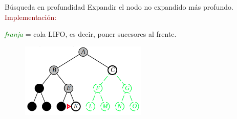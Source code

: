 \begin{frame}{Búsqueda en profundidad}
Expandir el nodo no expandido más profundo.\\
\textcolor{DarkRed}{Implementación:}
\begin{center}
    \textit{\textcolor{Green}{franja}} = cola LIFO, es decir, poner sucesores al
    frente.\\
\end{center}
\begin{figure}
    \centering
    \includegraphics[width = 60mm, scale = 0.7]{50_chap3_pag50.PNG}
\end{figure}
\end{frame}
